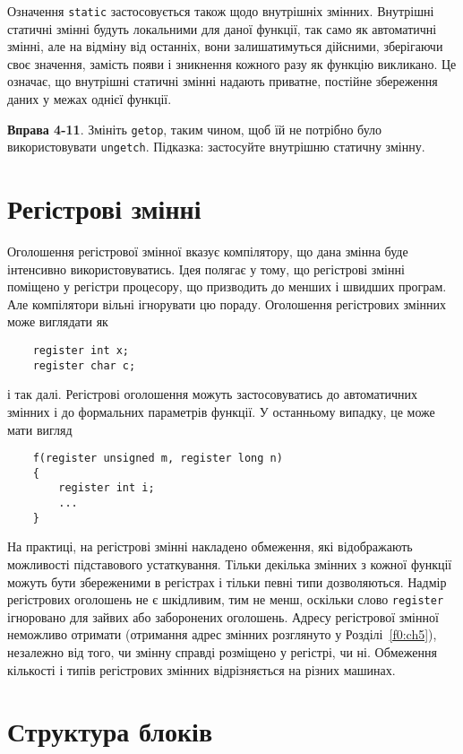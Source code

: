 \documentclass[a4paper,12pt]{book}
\begin{document}
  Означення \texttt{static} застосовується також щодо внутрішніх змінних. Внутрішні
  статичні змінні будуть локальними для даної функції, так само як автоматичні
  змінні, але на відміну від останніх, вони залишатимуться дійсними, зберігаючи своє
  значення, замість появи і зникнення кожного разу як функцію викликано. Це означає, що
  внутрішні статичні змінні надають приватне, постійне збереження даних у межах однієї
  функції.

  \textbf{Вправа 4-11}. Змініть \texttt{getop}, таким чином, щоб їй не потрібно було
  використовувати \texttt{ungetch}. Підказка: застосуйте внутрішню статичну змінну.

\section{Регістрові змінні}


  Оголошення регістрової змінної вказує компілятору, що дана змінна буде інтенсивно
  використовуватись. Ідея полягає у тому, що регістрові змінні поміщено у регістри
  процесору, що призводить до менших і швидших програм. Але компілятори вільні ігнорувати
  цю пораду. Оголошення регістрових змінних може виглядати як
  \begin{verbatim}
    register int x;
    register char c;
  \end{verbatim}
  і так далі. Регістрові оголошення можуть застосовуватись до автоматичних змінних і
  до формальних параметрів функції. У останньому випадку, це може мати вигляд
  \begin{verbatim}
    f(register unsigned m, register long n)
    {
        register int i;
        ...
    }
  \end{verbatim}

  На практиці, на регістрові змінні накладено обмеження, які відображають можливості
  підставового устаткування. Тільки декілька змінних з кожної функції можуть бути
  збереженими в регістрах і тільки певні типи дозволяються. Надмір регістрових оголошень
  не є шкідливим, тим не менш, оскільки слово \texttt{register} ігноровано для зайвих або
  заборонених оголошень. Адресу регістрової змінної неможливо отримати (отримання адрес
  змінних розглянуто у Розділі~\ref{f0:ch5}), незалежно від того, чи змінну
  справді розміщено у регістрі, чи ні. Обмеження кількості і типів регістрових змінних
  відрізняється на різних машинах.

\section{Структура блоків}
\end{document}
